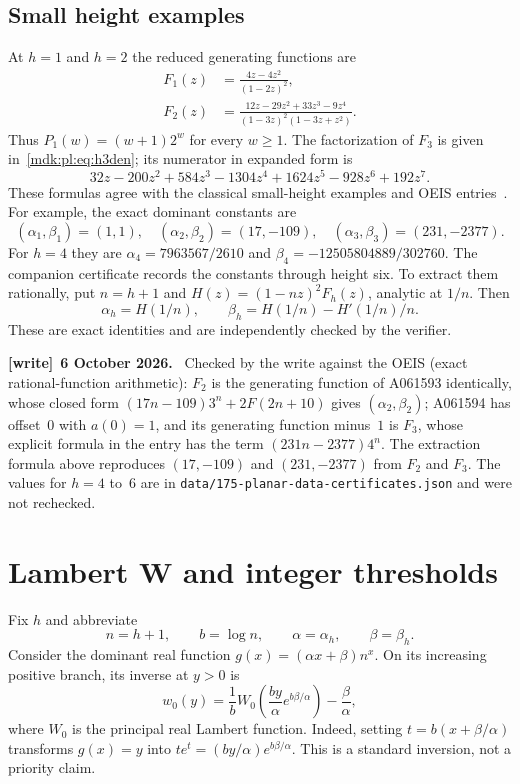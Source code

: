 \documentclass[11pt,letterpaper]{article}
\numberwithin{equation}{section}
\theoremstyle{remark}\newtheorem{remark}[theorem]{Remark}
\newcommand{\file}[1]{\nolinkurl{#1}}
\newenvironment{writenote}[1][]{\par\smallskip\begingroup\small
 \noindent\textbf{[write]}\if\relax\detokenize{#1}\relax\else~\textbf{#1.}\fi\ }%
 {\par\endgroup\smallskip}
\begin{document}
\subsection{Small height examples}
At $h=1$ and $h=2$ the reduced generating functions are
\begin{align}
 F_1(z)&=\frac{4z-4z^2}{(1-2z)^2},\label{mdk:pl:eq:F1}\\
 F_2(z)&=\frac{12z-29z^2+33z^3-9z^4}{(1-3z)^2(1-3z+z^2)}.\label{mdk:pl:eq:F2}
\end{align}
Thus $P_1(w)=(w+1)2^w$ for every $w\ge1$. The factorization of $F_3$ is given in~\eqref{mdk:pl:eq:h3den}; its numerator in expanded form is
\[
 32z-200z^2+584z^3-1304z^4+1624z^5-928z^6+192z^7.
\]
These formulas agree with the classical small-height examples and OEIS entries~\cite{oeisA061593,oeisA061594}. For example, the exact dominant constants are
\[
 (\alpha_1,\beta_1)=(1,1),\quad
 (\alpha_2,\beta_2)=(17,-109),\quad
 (\alpha_3,\beta_3)=(231,-2377).
\]
For $h=4$ they are $\alpha_4=7963567/2610$ and $\beta_4=-12505804889/302760$. The companion certificate records the constants through height six. To extract them rationally, put $n=h+1$ and $H(z)=(1-nz)^2F_h(z)$, analytic at $1/n$. Then
\[
 \alpha_h=H(1/n),\qquad \beta_h=H(1/n)-H'(1/n)/n.
\]
These are exact identities and are independently checked by the verifier.
\begin{writenote}[6 October 2026]
Checked by the write against the OEIS (exact rational-function arithmetic): $F_2$ is the generating function of A061593 \cite{oeisA061593} identically, whose closed form $(17n-109)3^n+2F(2n+10)$ gives $(\alpha_2,\beta_2)$; A061594 \cite{oeisA061594} has offset~0 with $a(0)=1$, and its generating function minus~$1$ is $F_3$, whose explicit formula in the entry has the term $(231n-2377)4^n$. The extraction formula above reproduces $(17,-109)$ and $(231,-2377)$ from $F_2$ and $F_3$. The values for $h=4$ to~$6$ are in \file{data/175-planar-data-certificates.json} and were not rechecked.
\end{writenote}

\section{Lambert W and integer thresholds}\label{mdk:pl:sec:lambert}
Fix $h$ and abbreviate
\[
 n=h+1,\qquad b=\log n,\qquad \alpha=\alpha_h,\qquad\beta=\beta_h.
\]
Consider the dominant real function $g(x)=(\alpha x+\beta)n^x$. On its increasing positive branch, its inverse at $y>0$ is
\begin{equation}\label{mdk:pl:eq:W}
 w_0(y)=\frac1b W_0\!\left(\frac{by}{\alpha}
                  e^{b\beta/\alpha}\right)-\frac\beta\alpha,
\end{equation}
where $W_0$ is the principal real Lambert function. Indeed, setting $t=b(x+\beta/\alpha)$ transforms $g(x)=y$ into
$t e^t=(by/\alpha)e^{b\beta/\alpha}$. This is a standard inversion, not a priority claim.
\end{document}
